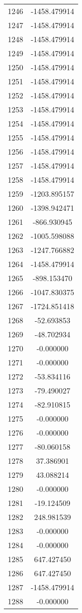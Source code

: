 \documentclass[12pt]{article}
\begin{document}
\begin{longtable}{@{}cc@{}}
1246 & -1458.479914 \\
1247 & -1458.479914 \\
1248 & -1458.479914 \\
1249 & -1458.479914 \\
1250 & -1458.479914 \\
1251 & -1458.479914 \\
1252 & -1458.479914 \\
1253 & -1458.479914 \\
1254 & -1458.479914 \\
1255 & -1458.479914 \\
1256 & -1458.479914 \\
1257 & -1458.479914 \\
1258 & -1458.479914 \\
1259 & -1203.895157 \\
1260 & -1398.942471 \\
1261 & -866.930945 \\
1262 & -1005.598088 \\
1263 & -1247.766882 \\
1264 & -1458.479914 \\
1265 & -898.153470 \\
1266 & -1047.830375 \\
1267 & -1724.851418 \\
1268 & -52.693853 \\
1269 & -48.702934 \\
1270 & -0.000000 \\
1271 & -0.000000 \\
1272 & -53.834116 \\
1273 & -79.490027 \\
1274 & -82.910815 \\
1275 & -0.000000 \\
1276 & -0.000000 \\
1277 & -80.060158 \\
1278 & 37.386901 \\
1279 & 43.088214 \\
1280 & -0.000000 \\
1281 & -19.124509 \\
1282 & 248.981539 \\
1283 & -0.000000 \\
1284 & -0.000000 \\
1285 & 647.427450 \\
1286 & 647.427450 \\
1287 & -1458.479914 \\
1288 & -0.000000 \\

\end{longtable}
\end{document}
